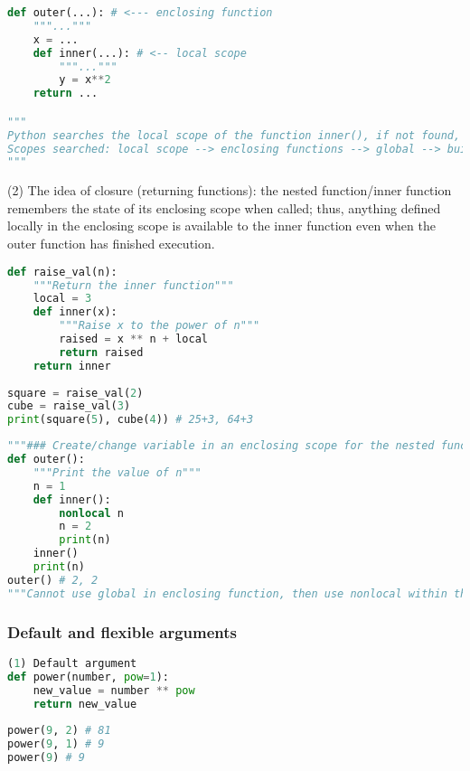 \documentclass[12pt]{article}
\begin{document}
\begin{lstlisting}[language=Python]
def outer(...): # <--- enclosing function 
    """..."""
    x = ...
    def inner(...): # <-- local scope
        """..."""
        y = x**2
    return ...

"""
Python searches the local scope of the function inner(), if not found, then searches the scope of enclosing function outer(), then global scope, lastly build-in scope.
Scopes searched: local scope --> enclosing functions --> global --> built-in
"""
\end{lstlisting}

\noindent
(2) The idea of closure (returning functions): the nested function/inner function remembers the state of its enclosing scope when called; thus, anything defined locally in the enclosing scope is available to the inner function even when the outer function has finished execution. 
\begin{lstlisting}[language=Python]
def raise_val(n):
    """Return the inner function"""
    local = 3
    def inner(x):
        """Raise x to the power of n"""
        raised = x ** n + local
        return raised
    return inner
    
square = raise_val(2)
cube = raise_val(3)
print(square(5), cube(4)) # 25+3, 64+3
\end{lstlisting}

\begin{lstlisting}[language=Python]
"""### Create/change variable in an enclosing scope for the nested function ###"""
def outer():
    """Print the value of n"""
    n = 1
    def inner():
        nonlocal n
        n = 2
        print(n)
    inner()
    print(n)
outer() # 2, 2
"""Cannot use global in enclosing function, then use nonlocal within the inner function on the same variable"""
\end{lstlisting}

\subsubsection{\normalsize Default and flexible arguments}
\begin{lstlisting}[language=Python]
(1) Default argument
def power(number, pow=1):
    new_value = number ** pow
    return new_value
    
power(9, 2) # 81
power(9, 1) # 9
power(9) # 9
\end{lstlisting}
\end{document}
